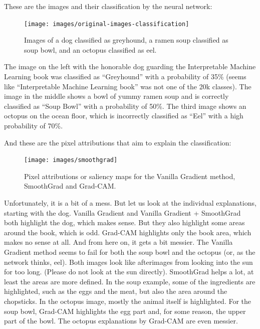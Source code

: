 \documentclass[
  10pt,
]{scrbook}
\begin{document}
These are the images and their classification by the neural network:

\begin{figure}

{\centering \texttt{[image: images/original-images-classification]} 

}

\caption{Images of a dog classified as greyhound, a ramen soup classified as soup bowl, and an octopus classified as eel.}\label{fig:unnamed-chunk-59}
\end{figure}

The image on the left with the honorable dog guarding the Interpretable Machine Learning book was classified as ``Greyhound'' with a probability of 35\% (seems like ``Interpretable Machine Learning book'' was not one of the 20k classes).
The image in the middle shows a bowl of yummy ramen soup and is correctly classified as ``Soup Bowl'' with a probability of 50\%.
The third image shows an octopus on the ocean floor, which is incorrectly classified as ``Eel'' with a high probability of 70\%.

And these are the pixel attributions that aim to explain the classification:

\begin{figure}

{\centering \texttt{[image: images/smoothgrad]} 

}

\caption{Pixel attributions or saliency maps for the Vanilla Gradient method, SmoothGrad and Grad-CAM.}\label{fig:unnamed-chunk-60}
\end{figure}

Unfortunately, it is a bit of a mess.
But let us look at the individual explanations, starting with the dog.
Vanilla Gradient and Vanilla Gradient + SmoothGrad both highlight the dog, which makes sense.
But they also highlight some areas around the book, which is odd.
Grad-CAM highlights only the book area, which makes no sense at all.
And from here on, it gets a bit messier.
The Vanilla Gradient method seems to fail for both the soup bowl and the octopus (or, as the network thinks, eel).
Both images look like afterimages from looking into the sun for too long.
(Please do not look at the sun directly).
SmoothGrad helps a lot, at least the areas are more defined.
In the soup example, some of the ingredients are highlighted, such as the eggs and the meat, but also the area around the chopsticks.
In the octopus image, mostly the animal itself is highlighted.
For the soup bowl, Grad-CAM highlights the egg part and, for some reason, the upper part of the bowl.
The octopus explanations by Grad-CAM are even messier.
\end{document}
